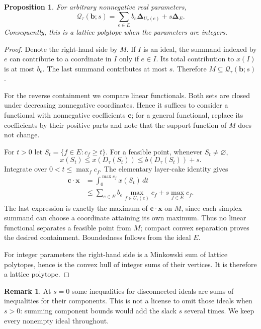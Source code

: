 \documentclass[11pt,letterpaper]{article}
\newtheorem{proposition}[proposition]{Proposition}
\theoremstyle{definition}
\newtheorem{remark}[remark]{Remark}
\newcommand{\bvec}{\mathbf b}
\newcommand{\xvec}{\mathbf x}
\newcommand{\cvec}{\mathbf c}
\newcommand{\QQ}{\mathcal Q}
\newcommand{\ds}{\boldsymbol\Delta}
\begin{document}
\begin{proposition}\label{prop:minkowski}
For arbitrary nonnegative real parameters,
\begin{equation}\label{eq:weighted-minkowski}
 \QQ_\tau(\bvec;s)=\sum_{e\in E}b_e\ds_{U_\tau(e)}+s\ds_E.
\end{equation}
Consequently, this is a lattice polytope when the parameters are integers.
\end{proposition}
\begin{proof}
Denote the right-hand side by $M$. If $I$ is an ideal, the summand indexed by
$e$ can contribute to a coordinate in $I$ only if $e\in I$. Its total
contribution to $x(I)$ is at most $b_e$. The last summand contributes at most
$s$. Therefore $M\subseteq\QQ_\tau(\bvec;s)$.

For the reverse containment we compare linear functionals. Both sets are
closed under decreasing nonnegative coordinates. Hence it suffices to
consider a functional with nonnegative coefficients $\cvec$; for a general
functional, replace its coefficients by their positive parts and note that
the support function of $M$ does not change.

For $t>0$ let $S_t=\{f\in E:c_f\geq t\}$. For a feasible point,
whenever $S_t\ne\varnothing$,
\[
 x(S_t)\leq x(D_\tau(S_t))\leq b(D_\tau(S_t))+s.
\]
Integrate over $0<t\leq\max_f c_f$. The elementary layer-cake identity gives
\begin{align*}
 \cvec\cdot\xvec
 &=\int_0^{\max c_f}x(S_t)\,dt\\
 &\leq\sum_{e\in E}b_e\max_{f\in U_\tau(e)}c_f+s\max_{f\in E}c_f.
\end{align*}
The last expression is exactly the maximum of $\cvec\cdot\xvec$ on $M$,
since each simplex summand can choose a coordinate attaining its own maximum.
Thus no linear functional separates a feasible point from $M$; compact
convex separation proves the desired containment. Boundedness follows from
the ideal $E$.

For integer parameters the right-hand side is a Minkowski sum of lattice
polytopes, hence is the convex hull of integer sums of their vertices.
It is therefore a lattice polytope.
\end{proof}

\begin{remark}\label{rem:ideals}
At $s=0$ some inequalities for disconnected ideals are sums of inequalities
for their components. This is not a license to omit those ideals when
$s>0$: summing component bounds would add the slack $s$ several times.
We keep every nonempty ideal throughout.
\end{remark}
\end{document}
